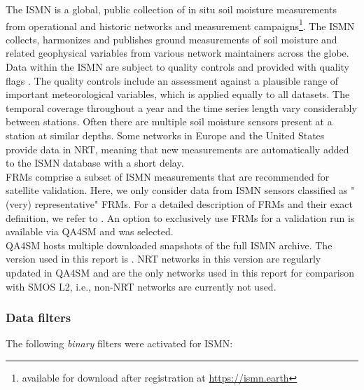 \noindent The \ac{ISMN} \citep{dorigo2021} is a global, public collection of in situ soil moisture measurements from operational and historic networks and measurement campaigns\footnote{available for download after registration at \url{https://ismn.earth}}.
The \ac{ISMN} collects, harmonizes and publishes ground measurements of soil moisture and related geophysical variables from various network maintainers across the globe.
Data within the \ac{ISMN} are subject to quality controls and provided with quality flags \citep{dorigo2013}.
The quality controls include an assessment against a plausible range of important meteorological variables, which is applied equally to all datasets.
The temporal coverage throughout a year and the time series length vary considerably between stations.
Often there are multiple soil moisture sensors present at a station at similar depths.
Some networks in Europe and the United States provide data in \ac{NRT}, meaning that new measurements are automatically added to the \ac{ISMN} database with a short delay.
\\[1em]
\ac{FRMs} comprise a subset of \ac{ISMN} measurements that are recommended for satellite validation.
Here, we only consider data from \ac{ISMN} sensors classified as "(very) representative" \ac{FRMs}.
For a detailed description of \ac{FRMs} and their exact definition, we refer to \cite{gruber2025}.
An option to exclusively use \ac{FRMs} for a validation run is available via \ac{QA4SM} and was selected.
\\[1em]
\ac{QA4SM} hosts multiple downloaded snapshots of the full \ac{ISMN} archive.
The version used in this report is .
\ac{NRT} networks in this version are regularly updated in \ac{QA4SM} and are the only networks used in this report for comparison with \ac{SMOS} \ac{L2}, i.e., non-NRT networks are currently not used.

\subsubsection{Data filters}

\noindent The following \textit{binary} filters were activated for \ac{ISMN}:
\begin{itemize}
\end{itemize}
\vspace{1em}

